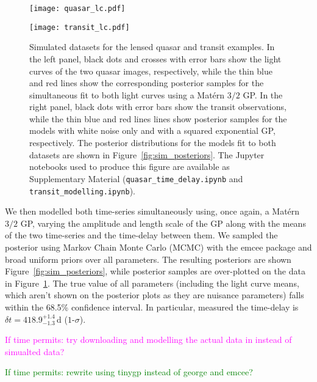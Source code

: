 \documentclass[letterpaper]{ar-1col}
\newcommand{\suz}[1]{\textcolor{magenta}{#1}}
\newcommand{\dan}[1]{\textcolor{green}{#1}}
\begin{document}
\begin{figure}[h]
  \centering
  \begin{minipage}[t]{0.48\linewidth}
    \texttt{[image: quasar\_lc.pdf]} 
  \end{minipage} \hfill
  \begin{minipage}[t]{0.48\linewidth}
    \texttt{[image: transit\_lc.pdf]}
  \end{minipage}
  \caption{Simulated datasets for the lensed quasar and transit examples. In the left panel, black dots and crosses with error bars show the light curves of the two quasar images, respectively, while the thin blue and red lines show the corresponding posterior samples for the simultaneous fit to both light curves using a Mat{\'e}rn $3/2$ GP.  In the right panel, black dots with error bars show the transit observations, while the thin blue and red lines lines show posterior samples for the models with white noise only and with a squared exponential GP, respectively. The posterior distributions for the models fit to both datasets are shown in Figure~\protect\ref{fig:sim_posteriors}. The {\sc Jupyter} notebooks used to produce this figure are available as Supplementary Material (\texttt{quasar\_time\_delay.ipynb} and \texttt{transit\_modelling.ipynb}).}
  \label{fig:sim_lcs}
\end{figure}

We then modelled both time-series simultaneously using, once again, a Mat{\'e}rn $3/2$ GP, varying the amplitude and length scale of the GP along with the means of the two time-series and the time-delay between them. We sampled the posterior using Markov Chain Monte Carlo (MCMC) with the {\sc emcee} package \citep{emcee} and broad uniform priors over all parameters. The resulting posteriors are shown Figure~\ref{fig:sim_posteriors}, while posterior samples are over-plotted on the data in Figure~\ref{fig:sim_lcs}. The true value of all parameters (including the light curve means, which aren't shown on the posterior plots as they are nuisance parameters) falls within the 68.5\% confidence interval. In particular, measured the time-delay is $\delta t = 418.9_{-1.3}^{+1.4}$\,d ($1$-$\sigma$).

\suz{If time permits: try downloading and modelling the actual data in \citet{1989A&A...215....1V} instead of simualted data?}

\dan{If time permits: rewrite using {\sc tinygp} instead of {\sc george} and {\sc emcee}?}
\end{document}
